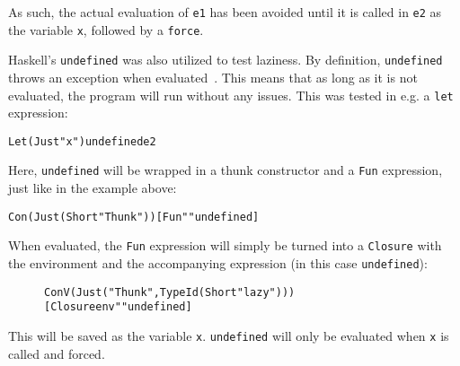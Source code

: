 \noindent As such, the actual evaluation of \texttt{e1} has been avoided
until it is called in \texttt{e2} as the variable \texttt{x}, followed by a
\texttt{force}.

Haskell's \texttt{undefined} was also utilized to test laziness. By definition,
\texttt{undefined} throws an exception when evaluated~\cite{Undefine63:online}.
This means that as long as it is not evaluated, the program will run without
any issues. This was tested in e.g. a \texttt{let} expression:
\begin{alltt}
  Let (Just "x") undefined e2
\end{alltt}
Here, \texttt{undefined} will be wrapped in a thunk constructor and a
\texttt{Fun} expression, just like in the example above:
\begin{alltt}
  Con (Just (Short "Thunk")) [Fun "" undefined]
\end{alltt}
When evaluated, the
\texttt{Fun} expression will simply be turned into a \texttt{Closure} with the
environment and the accompanying expression (in this case \texttt{undefined}):
\begin{figure}[!ht]
\begin{alltt}
  ConV (Just ("Thunk",TypeId (Short "lazy")))
    [Closure env "" undefined]
\end{alltt}
\end{figure}

\noindent This will be saved as the variable \texttt{x}. \texttt{undefined} will
only be evaluated when \texttt{x} is called and forced.
